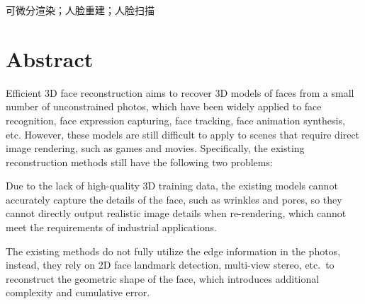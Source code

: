 \documentclass{scutmaster}
\begin{document}
 可微分渲染；人脸重建；人脸扫描

\chapter{Abstract}

Efficient 3D face reconstruction aims to recover 3D models of faces from a small number of unconstrained photos,
which have been widely applied to face recognition, face expression capturing, face tracking, face animation synthesis, etc.
However, these models are still difficult to apply to scenes that require direct image rendering, such as games and movies.
Specifically, the existing reconstruction methods still have the following two problems:
\begin{enumerate*}
\item Due to the lack of high-quality 3D training data, the existing models cannot accurately capture the details of the face,
such as wrinkles and pores,
so they cannot directly output realistic image details when re-rendering, which cannot meet the requirements of industrial applications.
\item The existing methods do not fully utilize the edge information in the photos,
instead, they rely on 2D face landmark detection, multi-view stereo, etc.\ to reconstruct the geometric shape of the face,
which introduces additional complexity and cumulative error.
\end{enumerate*}
\end{document}
